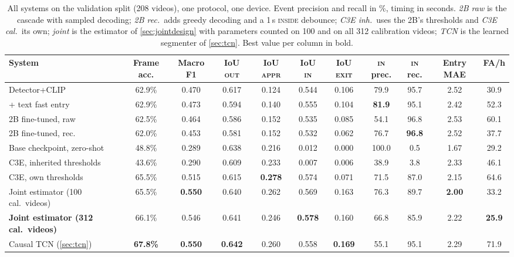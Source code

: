 \documentclass[journal]{IEEEtran}
\newcommand{\st}[1]{\textsc{#1}}
\begin{document}
\begin{table}[t]
\centering
\caption{All systems on the validation split (208 videos), one protocol, one device.  Event precision and recall in \%, timing in seconds.  \emph{2B raw} is the cascade with sampled decoding; \emph{2B rec.}\ adds greedy decoding and a 1\,s \st{inside} debounce; \emph{C3E inh.}\ uses the 2B's thresholds and \emph{C3E cal.}\ its own; \emph{joint} is the estimator of \cref{sec:jointdesign} with parameters counted on 100 and on all 312 calibration videos; \emph{TCN} is the learned segmenter of \cref{sec:tcn}. Best value per column in bold.}
\label{tab:main}
\footnotesize
\begin{tabular}{@{}lcccccccccc@{}}
\toprule
System & Frame acc. & Macro F1 & IoU \st{out} & IoU \st{appr} & IoU \st{in} &
IoU \st{exit} & \st{in} prec. & \st{in} rec. & Entry MAE & FA/h \\
\midrule
Detector+CLIP~\cite{priorsystem2026} & 62.9\% & 0.470 & 0.617 & 0.124 & 0.544 & 0.106 & 79.9 & 95.7 & 2.52 & 30.9 \\
\quad + text fast entry              & 62.9\% & 0.473 & 0.594 & 0.140 & 0.555 & 0.104 & \textbf{81.9} & 95.1 & 2.42 & 52.3 \\
2B fine-tuned, raw                   & 62.5\% & 0.464 & 0.586 & 0.152 & 0.535 & 0.085 & 54.1 & 96.8 & 2.53 & 60.1 \\
2B fine-tuned, rec.                  & 62.0\% & 0.453 & 0.581 & 0.152 & 0.532 & 0.062 & 76.7 & \textbf{96.8} & 2.52 & 37.7 \\
Base checkpoint, zero-shot           & 48.8\% & 0.289 & 0.638 & 0.216 & 0.012 & 0.000 & 100.0 & 0.5 & 1.67 & 29.2 \\
C3E, inherited thresholds            & 43.6\% & 0.290 & 0.609 & 0.233 & 0.007 & 0.006 & 38.9 & 3.8 & 2.33 & 46.1 \\
C3E, own thresholds                  & 65.5\% & 0.515 & 0.615 & \textbf{0.278} & 0.574 & 0.071 & 71.5 & 87.0 & 2.15 & 64.6 \\
Joint estimator (100 cal.\ videos)   & 65.5\% & \textbf{0.550} & 0.640 & 0.262 & 0.569 & 0.163 & 76.3 & 89.7 & \textbf{2.00} & 33.2 \\
\textbf{Joint estimator (312 cal.\ videos)} & 66.1\% & 0.546 & 0.641 & 0.246 & \textbf{0.578} & 0.160 & 66.8 & 85.9 & 2.22 & \textbf{25.9} \\
Causal TCN (\cref{sec:tcn})          & \textbf{67.8\%} & \textbf{0.550} & \textbf{0.642} & 0.260 & 0.558 & \textbf{0.169} & 55.1 & 95.1 & 2.29 & 71.9 \\
\bottomrule
\end{tabular}
\end{table}
\end{document}
